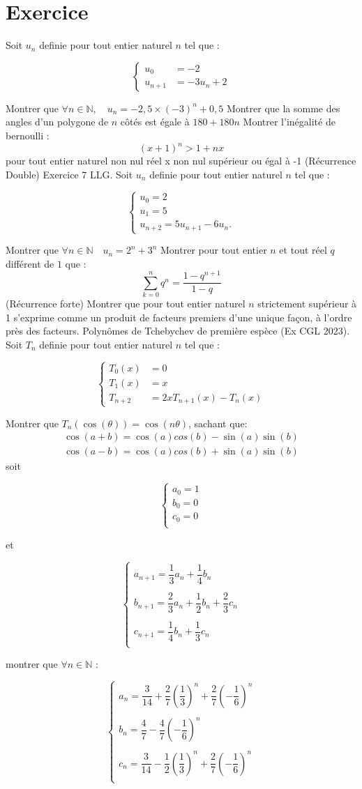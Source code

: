 \documentclass{exam}
\newcommand*{\n}{\mathbb{N}}
\newcommand*{\sys}[1]{
$$
\begin{cases}
#1
\end{cases}
$$
}
\begin{document}
\section{Exercice}
\begin{questions}
\question Soit $u_n$ definie pour tout entier naturel $n$ tel que :
\sys{
u_0&=-2\\
u_{n+1}&=-3u_n+2
}
Montrer que $
\forall n\in\n,
\quad
u_n=-2,5\times(-3)^n+0,5
$
\question Montrer que la somme des angles d'un polygone de $n$ côtés est égale à $180+180n$
\question Montrer l'inégalité de bernoulli : 
$$
(x+1)^n>1+nx
$$
pour tout entier naturel non nul réel x non nul supérieur ou égal à -1
\question (Récurrence Double) Exercice 7 LLG. Soit $u_n$ definie pour tout entier naturel $n$ tel que :
\sys{
u_0 = 2
\\
u_1 = 5
\\
u_{n+2} = 5u_{n+1} - 6u_n.
}
Montrer que
$\forall n\in\n \quad u_n=2^n+3^n$
\question Montrer pour tout entier $n$ et tout réel $q$ différent de $1$ que :
$$
\sum_{k=0}^{n}q^n=\frac{1-q^{n+1}}{1-q}
$$
\question (Récurrence forte) Montrer que pour tout entier naturel $n$ strictement supérieur à 1 
s'exprime comme un produit de facteurs premiers d'une unique façon, à l'ordre près des facteurs.
\question Polynômes de Tchebychev de première espèce (Ex CGL 2023).
Soit $T_n$ definie pour tout entier naturel $n$ tel que :
\sys{
T_0(x)&=0
\\
T_1(x)&=x
\\
T_{n+2}&=2xT_{n+1}(x)-T_n(x)
}
Montrer que $T_n(\cos(\theta))=\cos(n\theta)$, sachant que:
\begin{align*}
\cos(a+b)=\cos(a)cos(b)-\sin(a)\sin(b)\\
\cos(a-b)=\cos(a)cos(b)+\sin(a)\sin(b)
\end{align*}
\question soit 
\sys{
a_0=1\\
b_0=0\\
c_0=0\\
}
et
\sys{
a_{n+1}=\dfrac{1}{3}a_n+\dfrac{1}{4}b_n\\
\\
b_{n+1}=\dfrac{2}{3}a_n+\dfrac{1}{2}b_n+\dfrac{2}{3}c_n\\
\\
c_{n+1}=\dfrac{1}{4}b_n+\dfrac{1}{3}c_n\\
}
montrer que $\forall n\in\n$ :
\sys{
a_n=\dfrac{3}{14}+\dfrac{2}{7}\left(\dfrac{1}{3}\right)^n+\dfrac{2}{7}\left(-\dfrac{1}{6}\right)^n\\
\\
b_n=\dfrac{4}{7}-\dfrac{4}{7}\left(-\dfrac{1}{6}\right)^n\\
\\
c_n=\dfrac{3}{14}-\dfrac{1}{2}\left(\dfrac{1}{3}\right)^n+\dfrac{2}{7}\left(-\dfrac{1}{6}\right)^n\\
}
\end{questions}
\end{document}
